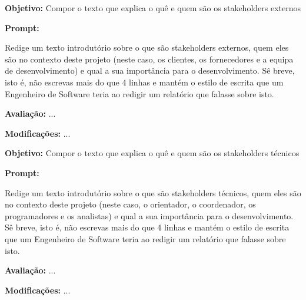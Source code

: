 \documentclass[a4paper,12pt]{scrreprt}
\begin{document}
\begin{tcolorbox}[
	title={Prompt P12 - Escrita do texto introdutório dos stakeholders externos},
	colback=white,
	colframe=black,
	arc=2mm,
	boxrule=0.5pt
	]
	\textbf{Objetivo:} Compor o texto que explica o quê e quem são os stakeholders externos \par
	\textbf{Prompt:} 
	\begin{tcolorbox}[
		listing only,
		breakable,
		enhanced,
		colback=white,
		colframe=black,
		listing options={
			breaklines=true,
			basicstyle=\ttfamily\small
		}
		]
		Redige um texto introdutório sobre o que são stakeholders externos, quem eles são no contexto deste projeto (neste caso, os clientes, os fornecedores e a equipa de desenvolvimento) e qual a sua importância para o desenvolvimento. 
Sê breve, isto é, não escrevas mais do que 4 linhas e mantém o estilo de escrita que um Engenheiro de Software teria ao redigir um relatório que falasse sobre isto.
	\end{tcolorbox}
	\par
	\textbf{Avaliação:} ... \par
	\textbf{Modificações:} ... \par
\end{tcolorbox}

\begin{tcolorbox}[
	title={Prompt P13 - Escrita do texto introdutório dos stakeholders técnicos},
	colback=white,
	colframe=black,
	arc=2mm,
	boxrule=0.5pt
	]
	\textbf{Objetivo:} Compor o texto que explica o quê e quem são os stakeholders técnicos \par
	\textbf{Prompt:} 
	\begin{tcolorbox}[
		listing only,
		breakable,
		enhanced,
		colback=white,
		colframe=black,
		listing options={
			breaklines=true,
			basicstyle=\ttfamily\small
		}
		]
		Redige um texto introdutório sobre o que são stakeholders técnicos, quem eles são no contexto deste projeto (neste caso, o orientador, o coordenador, os programadores e os analistas) e qual a sua importância para o desenvolvimento. 
		Sê breve, isto é, não escrevas mais do que 4 linhas e mantém o estilo de escrita que um Engenheiro de Software teria ao redigir um relatório que falasse sobre isto.
	\end{tcolorbox}
	\par
	\textbf{Avaliação:} ... \par
	\textbf{Modificações:} ... \par
\end{tcolorbox}
\end{document}
